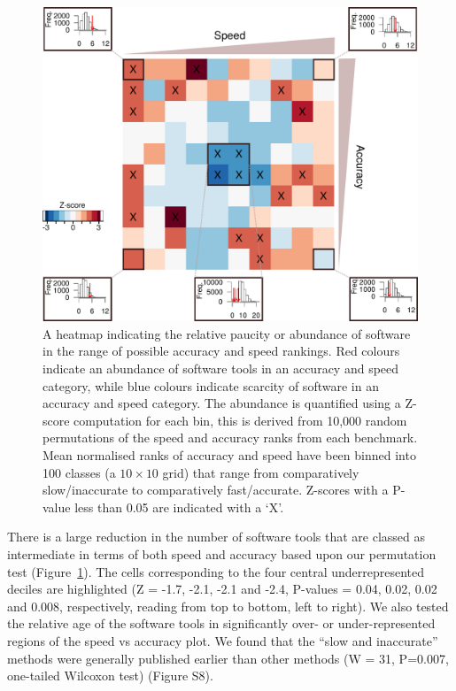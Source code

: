 \documentclass[fleqn,10pt]{SelfArx} %
\begin{document}
\begin{figure}
\includegraphics[width=\textwidth]{figure2.pdf}
\caption{A heatmap indicating the relative paucity or abundance of software in the range of possible accuracy and speed rankings. Red colours indicate an abundance of software tools in an accuracy and speed category, while blue colours indicate scarcity of software in an accuracy and speed category. The abundance is quantified using a Z-score computation for each bin, this is derived from 10,000 random permutations of the speed and accuracy ranks from each benchmark. Mean normalised ranks of accuracy and speed have been binned into 100 classes (a $10\times10$ grid) that range from comparatively slow/inaccurate to comparatively fast/accurate. Z-scores with a P-value less than 0.05 are indicated with a ‘X’.}
\label{fig:speedaccuracy}
\end{figure}

There is a large reduction in the number of software tools that are classed as intermediate in terms of both speed and accuracy based upon our permutation test (Figure~\ref{fig:speedaccuracy}). The cells corresponding to the four central underrepresented deciles are highlighted (Z = -1.7, -2.1, -2.1 and -2.4, P-values = 0.04, 0.02, 0.02 and 0.008, respectively, reading from top to bottom, left to right). We also tested the relative age of the software tools in significantly over- or under-represented regions of the speed vs accuracy plot. We found that the “slow and inaccurate” methods were generally published earlier than other methods (W = 31, P=0.007, one-tailed Wilcoxon test) (Figure S8).
\end{document}
